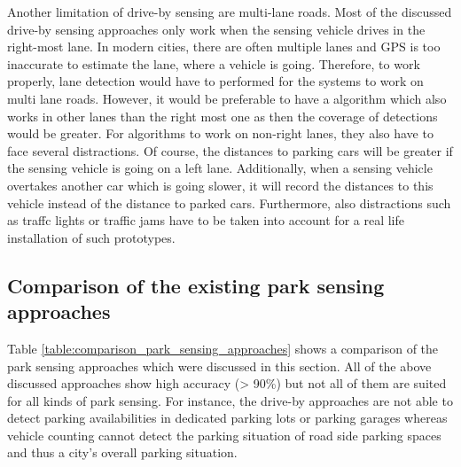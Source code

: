 Another limitation of drive-by sensing are multi-lane roads. Most of the discussed drive-by sensing approaches only work when the sensing vehicle drives in the right-most lane. In modern cities, there are often multiple lanes and GPS is too inaccurate to estimate the lane, where a vehicle is going. Therefore, to work properly, lane detection would have to performed for the systems to work on multi lane roads. However, it would be preferable to have a algorithm which also works in other lanes than the right most one as then the coverage of detections would be greater. For algorithms to work on non-right lanes, they also have to face several distractions. Of course, the distances to parking cars will be greater if the sensing vehicle is going on a left lane. Additionally, when a sensing vehicle overtakes another car which is going slower, it will record the distances to this vehicle instead of the distance to parked cars. Furthermore, also distractions such as traffc lights or traffic jams have to be taken into account for a real life installation of such prototypes.




\subsection{Comparison of the existing park sensing approaches}
\label{sec:comparison_park_sensing_approaches}

Table \ref{table:comparison_park_sensing_approaches} shows a comparison of the park sensing approaches which were discussed in this section. All of the above discussed approaches show high accuracy (> 90\%) but not all of them are suited for all kinds of park sensing. For instance, the drive-by approaches are not able to detect parking availabilities in dedicated parking lots or parking garages whereas vehicle counting cannot detect the parking situation of road side parking spaces and thus a city's overall parking situation.

